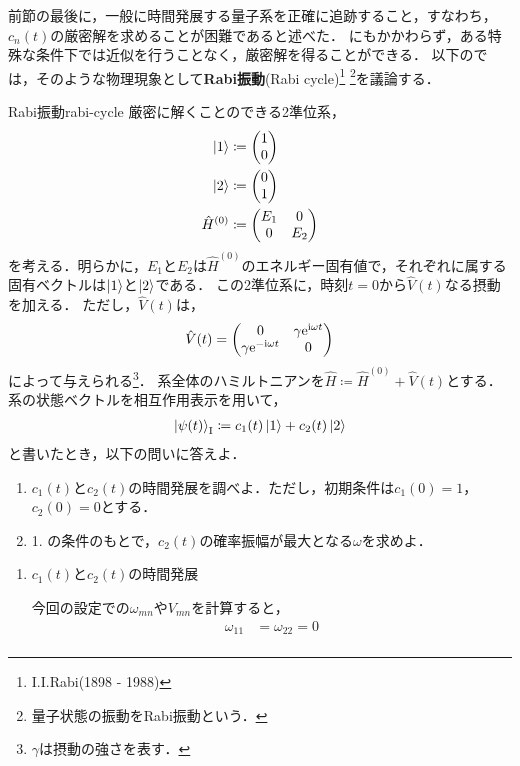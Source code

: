 \documentclass{report}
\begin{document}
  前節の最後に，一般に時間発展する量子系を正確に追跡すること，すなわち，$c_n(t)$の厳密解を求めることが困難であると述べた．
  にもかかわらず，ある特殊な条件下では近似を行うことなく，厳密解を得ることができる．
  以下のでは，そのような物理現象として\textbf{Rabi振動}(Rabi cycle)\footnote{I.I.Rabi(1898 - 1988)}
  \footnote{量子状態の振動をRabi振動という．}を議論する．
  \begin{myex}{Rabi振動}{rabi-cycle}
    厳密に解くことのできる2準位系，
    \begin{align}
      \ket{1} &\coloneqq \mqty(1\\ 0) \\
      \ket{2} &\coloneqq \mqty(0\\ 1) \\
      \hat{H}^{(0)} &\coloneqq \mqty(E_1 & 0\\ 0 & E_2)
    \end{align}
    を考える．明らかに，$E_1$と$E_2$は$\hat{H}^{(0)}$のエネルギー固有値で，それぞれに属する固有ベクトルは$\ket{1}$と$\ket{2}$である．
    この2準位系に，時刻$t = 0$から$\hat{V}(t)$なる摂動を加える．
    ただし，$\hat{V}(t)$は，
    \begin{align}
      \hat{V}(t) = \mqty(
        0 & \gamma\e^{\i\omega t} \\
        \gamma\e^{-\i\omega t} & 0
      )
    \end{align}
    によって与えられる\footnote{$\gamma$は摂動の強さを表す．}．
    系全体のハミルトニアンを$\hat{H} \coloneqq \hat{H}^{(0)} + \hat{V}(t)$とする．
    系の状態ベクトルを相互作用表示を用いて，
    \begin{align}
      \ket{\psi(t)}_{\mathrm{I}} \coloneqq c_1(t)\ket{1} + c_2(t)\ket{2}
    \end{align}
    と書いたとき，以下の問いに答えよ．
    \begin{enumerate}
      \item $c_1(t)$と$c_2(t)$の時間発展を調べよ．ただし，初期条件は$c_1(0) = 1$，$c_2(0) = 0$とする．
      \item 1. の条件のもとで，$c_2(t)$の確率振幅が最大となる$\omega$を求めよ．
    \end{enumerate}
    \tcblower
    \begin{enumerate}
      \item $c_1(t)$と$c_2(t)$の時間発展\par
        今回の設定での$\omega_{mn}$や$V_{mn}$を計算すると，
        \begin{align}
          \omega_{11} &= \omega_{22} = 0 \\ 

\end{align}
\end{enumerate}
\end{myex}
\end{document}

